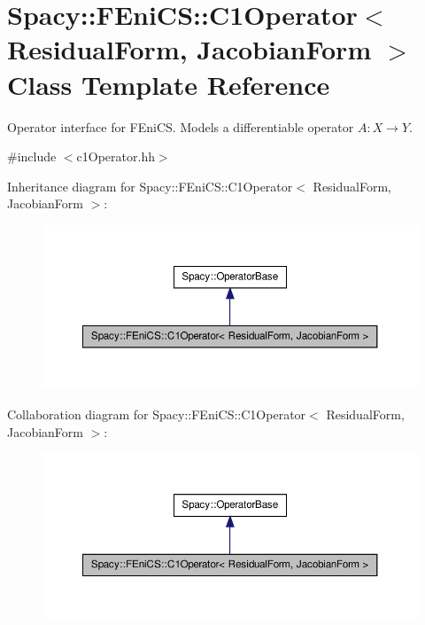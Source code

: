 \hypertarget{classSpacy_1_1FEniCS_1_1C1Operator}{\section{\-Spacy\-:\-:\-F\-Eni\-C\-S\-:\-:\-C1\-Operator$<$ \-Residual\-Form, \-Jacobian\-Form $>$ \-Class \-Template \-Reference}
\label{classSpacy_1_1FEniCS_1_1C1Operator}
}


\-Operator interface for \-F\-Eni\-C\-S. \-Models a differentiable operator $A:X\rightarrow Y$.  




{\ttfamily \#include $<$c1\-Operator.\-hh$>$}



\-Inheritance diagram for \-Spacy\-:\-:\-F\-Eni\-C\-S\-:\-:\-C1\-Operator$<$ \-Residual\-Form, \-Jacobian\-Form $>$\-:
\nopagebreak
\begin{figure}[H]
\begin{center}
\leavevmode
\includegraphics[width=350pt]{classSpacy_1_1FEniCS_1_1C1Operator__inherit__graph}
\end{center}
\end{figure}


\-Collaboration diagram for \-Spacy\-:\-:\-F\-Eni\-C\-S\-:\-:\-C1\-Operator$<$ \-Residual\-Form, \-Jacobian\-Form $>$\-:
\nopagebreak
\begin{figure}[H]
\begin{center}
\leavevmode
\includegraphics[width=350pt]{classSpacy_1_1FEniCS_1_1C1Operator__coll__graph}
\end{center}
\end{figure}
